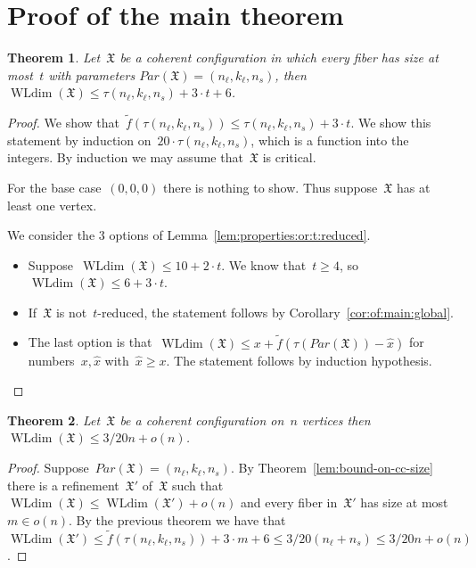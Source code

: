 \documentclass[english,a4paper]{article}
\theoremstyle{plain}
\newtheorem{theorem}             {Theorem}[section]
\theoremstyle{definition}
\newcommand{\coherentConfig}{\ensuremath{\mathfrak{X}}}
\DeclareMathOperator*{\WLdim}{WLdim}
\newcommand{\wldim}[1]{\ensuremath{\WLdim\left(#1\right)}}
\newcommand{\f}{f}
\begin{document}
     


\section{Proof of the main theorem}
\label{sec:proof:of:main:thm}


\begin{theorem}
    Let~$\coherentConfig$ be a coherent configuration in which every fiber has size at most~$t$ with parameters $Par(\coherentConfig)=(n_\ell, k_\ell,n_s)$,  then~$\wldim{\coherentConfig}\leq \tau(n_\ell, k_\ell,n_s)+3\cdot t+6$.
\end{theorem}
\begin{proof}
    We show that~$\widetilde{\f}(\tau(n_\ell, k_\ell,n_s))\leq \tau(n_\ell, k_\ell,n_s)+3\cdot t$.
    We show this statement by induction on~$20\cdot \tau(n_\ell, k_\ell,n_s)$, which is a function into the integers. By induction we may assume that~$\coherentConfig$ is critical.

    For the base case~$(0,0,0)$ there is nothing to show. Thus suppose~$\coherentConfig$ has at least one vertex.

    We consider the 3 options of Lemma~\ref{lem:properties:or:t:reduced}.
    \begin{itemize}
        \item Suppose~$\wldim{\coherentConfig} \leq 10 + 2\cdot t$. We know that~$t\geq 4$, so~$\wldim{\coherentConfig} \leq  6 + 3\cdot t$.
        \item If~$\coherentConfig$ is not~$t$-reduced, the statement follows by Corollary~\ref{cor:of:main:global}.
        \item  The last option is that~$\wldim{\coherentConfig}\leq x+\widetilde{\f}( \tau(Par(\coherentConfig))-\hat{x})$ for numbers~$x,\hat{x}$ with~$\hat{x}\geq x$. The statement follows by induction hypothesis.\qedhere
    \end{itemize}
\end{proof}

\begin{theorem}
    Let~$\coherentConfig$ be a coherent configuration on~$n$ vertices then~$\wldim{\coherentConfig}\leq 3/20 n + o(n)$.
\end{theorem}
\begin{proof}
    Suppose~$Par(\coherentConfig)=(n_\ell, k_\ell,n_s)$.
    By Theorem~\ref{lem:bound-on-cc-size} there is a refinement~$\coherentConfig'$ of~$\coherentConfig$ such that~$\wldim{\coherentConfig}\leq \wldim{\coherentConfig'} +o(n)$ and every fiber in~$\coherentConfig'$ has size at most~$m\in o(n)$.
    By the previous theorem we have that~$\wldim{\coherentConfig'}\leq \widetilde{\f}(\tau(n_\ell, k_\ell,n_s))+3\cdot m+6\leq 3/20(n_\ell+n_s)\leq 3/20 n+o(n)$.
\end{proof}
     
\end{document}
